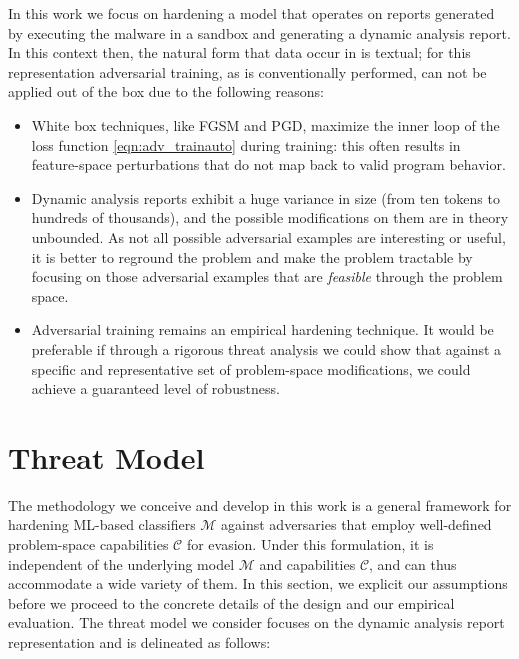 In this work we focus on hardening a model that operates on reports generated by executing the malware in a sandbox and generating a dynamic analysis report.
In this context then, the natural form that data occur in is textual; for this representation adversarial training, as is conventionally performed, can not be applied out of the box due to the following reasons:
\begin{itemize}
    \item White box techniques, like FGSM and PGD, maximize the inner loop of the loss function \eqref{eqn:adv_trainauto} during training: this often results in feature-space perturbations that do not map back to valid program behavior.
    \item Dynamic analysis reports exhibit a huge variance in size (from ten tokens to hundreds of thousands), and the possible modifications on them are in theory unbounded. As not all possible adversarial examples are interesting or useful, it is better to reground the problem and make the problem tractable by focusing on those adversarial examples that are \textit{feasible} through the problem space.
    \item Adversarial training remains an empirical hardening technique. It would be preferable if through a rigorous threat analysis we could show that against a specific and representative set of problem-space modifications, we could achieve a guaranteed level of robustness.
\end{itemize}

\section{Threat Model}
\label{sec:threatauto}

The methodology we conceive and develop in this work is a general framework for hardening ML-based classifiers $\mathcal{M}$ against adversaries that employ well-defined problem-space capabilities $\mathcal{C}$ for evasion.
Under this formulation, it is independent of the underlying model $\mathcal{M}$ and capabilities $\mathcal{C}$, and can thus accommodate a wide variety of them.
In this section, we explicit our assumptions before we proceed to the concrete details of the design and our empirical evaluation.
The threat model we consider focuses on the dynamic analysis report representation and is delineated as follows:

